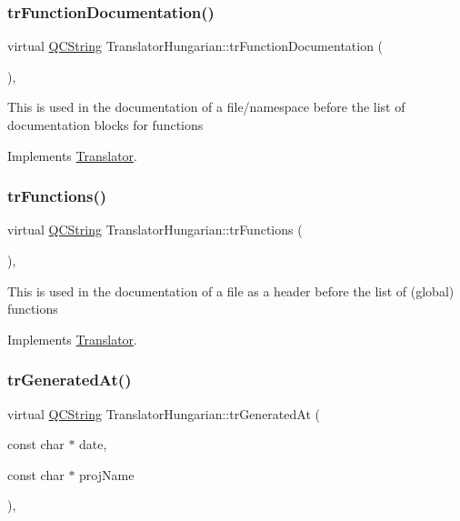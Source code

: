 \subsubsection{\texorpdfstring{trFunctionDocumentation()}{trFunctionDocumentation()}}
{\footnotesize\ttfamily virtual \mbox{\hyperlink{class_q_c_string}{Q\+C\+String}} Translator\+Hungarian\+::tr\+Function\+Documentation (\begin{DoxyParamCaption}{ }\end{DoxyParamCaption})\hspace{0.3cm}{\ttfamily [inline]}, {\ttfamily [virtual]}}

This is used in the documentation of a file/namespace before the list of documentation blocks for functions 

Implements \mbox{\hyperlink{class_translator}{Translator}}.

\mbox{\label{class_translator_hungarian_aa4eba162da9c6f8a83305464ebb90ac0}} 
\subsubsection{\texorpdfstring{trFunctions()}{trFunctions()}}
{\footnotesize\ttfamily virtual \mbox{\hyperlink{class_q_c_string}{Q\+C\+String}} Translator\+Hungarian\+::tr\+Functions (\begin{DoxyParamCaption}{ }\end{DoxyParamCaption})\hspace{0.3cm}{\ttfamily [inline]}, {\ttfamily [virtual]}}

This is used in the documentation of a file as a header before the list of (global) functions 

Implements \mbox{\hyperlink{class_translator}{Translator}}.

\mbox{\label{class_translator_hungarian_a23160fab5c6eaacbe6ae04c4eb090f5b}} 
\subsubsection{\texorpdfstring{trGeneratedAt()}{trGeneratedAt()}}
{\footnotesize\ttfamily virtual \mbox{\hyperlink{class_q_c_string}{Q\+C\+String}} Translator\+Hungarian\+::tr\+Generated\+At (\begin{DoxyParamCaption}\item[{const char $\ast$}]{date,  }\item[{const char $\ast$}]{proj\+Name }\end{DoxyParamCaption})\hspace{0.3cm}{\ttfamily [inline]}, {\ttfamily [virtual]}}

